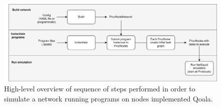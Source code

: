 \begin{figure}[hp]
    \centering
    \includegraphics[width=\textwidth]{figures/qoala/simulator_sequence.png}
    \caption{High-level overview of sequence of steps performed in order to simulate a network running programs on nodes implemented Qoala.
    }
    \label{fig:app:simulator_sequence}
\end{figure}


